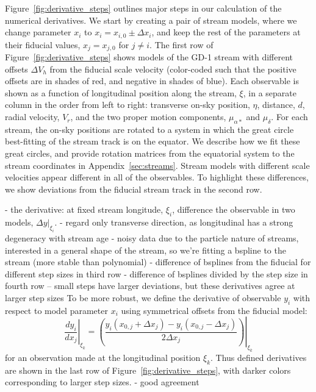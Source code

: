 \documentclass[modern]{aastex61}
\begin{document}
Figure~\ref{fig:derivative_steps} outlines major steps in our calculation of the numerical derivatives.
We start by creating a pair of stream models, where we change parameter $x_i$ to $x_i = x_{i,0} \pm \Delta x_i$, and keep the rest of the parameters at their fiducial values, $x_j = x_{j,0}$ for $j\neq i$.
The first row of Figure~\ref{fig:derivative_steps} shows models of the GD-1 stream with different offsets $\Delta V_{h}$ from the fiducial scale velocity (color-coded such that the positive offsets are in shades of red, and negative in shades of blue).
Each observable is shown as a function of longitudinal position along the stream, $\xi$, in a separate column in the order from left to right: transverse on-sky position, $\eta$, distance, $d$, radial velocity, $V_r$, and the two proper motion components, $\mu_{\alpha*}$ and $\mu_\delta$.
For each stream, the on-sky positions are rotated to a system in which the great circle best-fitting of the stream track is on the equator.
We describe how we fit these great circles, and provide rotation matrices from the equatorial system to the stream coordinates in Appendix~\ref{sec:streams}.
Stream models with different scale velocities appear different in all of the observables.
To highlight these differences, we show deviations from the fiducial stream track in the second row.


- the derivative: at fixed stream longitude, $\xi_i$, difference the observable in two models, $\Delta y|_{\xi_i}$.
- regard only transverse direction, as longitudinal has a strong degeneracy with stream age
- noisy data due to the particle nature of streams, interested in a general shape of the stream, so we're fitting a bspline to the stream (more stable than polynomial)
- difference of bsplines from the fiducial for different step sizes in third row
- difference of bsplines divided by the step size in fourth row -- small steps have larger deviations, but these derivatives agree at larger step sizes
To be more robust, we define the derivative of observable $y_i$ with respect to model parameter $x_i$ using symmetrical offsets from the fiducial model:
\begin{equation}
\left.\frac{d y_i}{d x_j}\right\rvert_{\xi_k} = \left.\left(\frac{y_i(x_{0,j} + \Delta x_j) - y_i(x_{0,j} - \Delta x_j)}{2\Delta x_j}\right)\right\rvert_{\xi_k}
\label{eq:derivative}
\end{equation}
for an observation made at the longitudinal position $\xi_k$.
Thus defined derivatives are shown in the last row of Figure~\ref{fig:derivative_steps}, with darker colors corresponding to larger step sizes.
- good agreement
\end{document}
